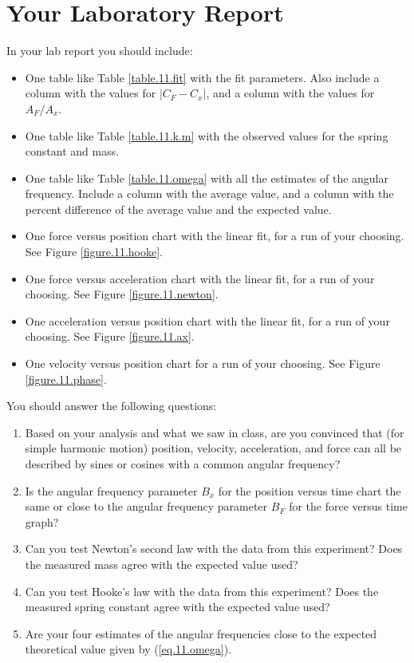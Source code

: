\section{Your Laboratory Report}
In your lab report you should include:
\begin{itemize}
    \item One table like Table \ref{table.11.fit} with the fit parameters. Also include a column with the values for $\vert C_{F} - C_{x} \vert$, and a column with the values for $A_{F} / A_{x}$.
    \item One table like Table \ref{table.11.k.m} with the observed values for the spring constant and mass.
    \item One table like Table \ref{table.11.omega} with all the estimates of the angular frequency. Include a column with the average value, and a column with the percent difference of the average value and the expected value.
    \item One force versus position chart with the linear fit, for a run of your choosing. See Figure \ref{figure.11.hooke}.
    \item One force versus acceleration chart with the linear fit, for a run of your choosing. See Figure \ref{figure.11.newton}.
    \item One acceleration versus position chart with the linear fit, for a run of your choosing. See Figure \ref{figure.11.ax}.
    \item One velocity versus position chart for a run of your choosing. See Figure \ref{figure.11.phase}.
\end{itemize}
You should answer the following questions:
\begin{enumerate}
    \item Based on your analysis and what we saw in class, are you convinced that (for simple harmonic motion) position, velocity, acceleration, and force can all be described by sines or cosines with a common angular frequency?
    \item Is the angular frequency parameter $B_{x}$ for the position versus time chart the same or close to the angular frequency parameter $B_{F}$ for the force versus time graph?
    \item Can you test Newton's second law with the data from this experiment? Does the measured mass agree with the expected value used?
    \item Can you test Hooke's law with the data from this experiment? Does the measured spring constant agree with the expected value used?
    \item Are your four estimates of the angular frequencies close to the expected theoretical value given by (\ref{eq.11.omega}).
\end{enumerate}
\newpage
